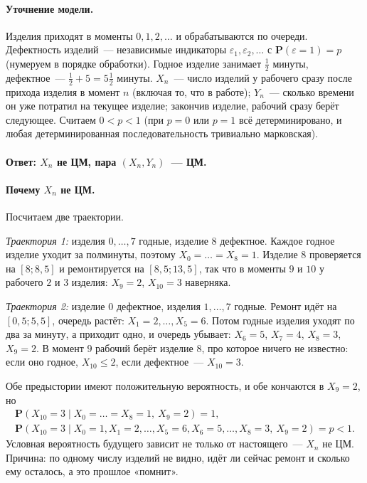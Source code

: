 \documentclass[11pt,a4paper]{article}
\theoremstyle{definition}
\newcommand{\PP}{\mathbf P}
\newcommand{\1}{\mathbf 1}
\begin{document}
\paragraph{Уточнение модели.} Изделия приходят в моменты $0,1,2,\dots$ и
обрабатываются по очереди. Дефектность изделий~--- независимые индикаторы
$\varepsilon_1,\varepsilon_2,\dots$ с $\PP(\varepsilon=1)=p$ (нумеруем в порядке
обработки). Годное изделие занимает $\frac12$ минуты, дефектное~---
$\frac12+5=5\frac12$ минуты. $X_n$~--- число изделий у рабочего сразу после
прихода изделия в момент $n$ (включая то, что в работе); $Y_n$~--- сколько
времени он уже потратил на текущее изделие; закончив изделие, рабочий сразу
берёт следующее. Считаем $0<p<1$ (при $p=0$ или $p=1$ всё детерминировано, и
любая детерминированная последовательность тривиально марковская).

\paragraph{Ответ: $X_n$ не ЦМ, пара $(X_n,Y_n)$~--- ЦМ.}

\paragraph{Почему $X_n$ не ЦМ.} Посчитаем две траектории.

\emph{Траектория 1:} изделия $0,\dots,7$ годные, изделие $8$ дефектное. Каждое
годное изделие уходит за полминуты, поэтому $X_0=\dots=X_8=1$. Изделие $8$
проверяется на $[8;8{,}5]$ и ремонтируется на $[8{,}5;13{,}5]$, так что в моменты
$9$ и $10$ у рабочего $2$ и $3$ изделия: $X_9=2$, $X_{10}=3$ наверняка.

\emph{Траектория 2:} изделие $0$ дефектное, изделия $1,\dots,7$ годные.
Ремонт идёт на $[0{,}5;5{,}5]$, очередь растёт: $X_1=2,\dots,X_5=6$. Потом
годные изделия уходят по два за минуту, а приходит одно, и очередь убывает:
$X_6=5$, $X_7=4$, $X_8=3$, $X_9=2$. В момент $9$ рабочий берёт изделие $8$,
про которое ничего не известно: если оно годное, $X_{10}\le2$, если
дефектное~--- $X_{10}=3$.

Обе предыстории имеют положительную вероятность, и обе кончаются
в $X_9=2$, но
\begin{gather*}
\PP(X_{10}=3\mid X_0=\dots=X_8=1,\ X_9=2)=1,\\
\PP(X_{10}=3\mid X_0=1,X_1=2,\dots,X_5=6,X_6=5,\dots,X_8=3,\ X_9=2)=p<1 .
\end{gather*}
Условная вероятность будущего зависит не только от настоящего~--- $X_n$ не
ЦМ. Причина: по одному числу изделий не видно, идёт ли сейчас ремонт и сколько
ему осталось, а это прошлое «помнит».
\end{document}
